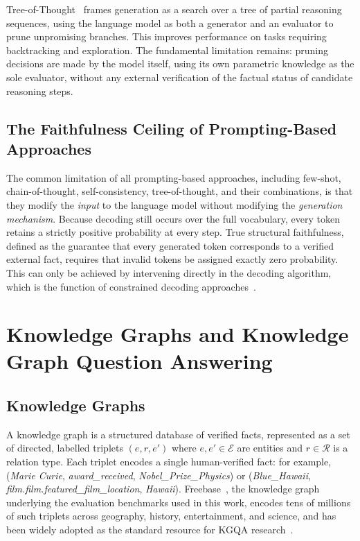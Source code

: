 Tree-of-Thought~\citep{yao2023tree} frames generation as a search over a tree of partial reasoning sequences, using the language model as both a generator and an evaluator to prune unpromising branches. This improves performance on tasks requiring backtracking and exploration. The fundamental limitation remains: pruning decisions are made by the model itself, using its own parametric knowledge as the sole evaluator, without any external verification of the factual status of candidate reasoning steps.

\subsection{The Faithfulness Ceiling of Prompting-Based Approaches}

The common limitation of all prompting-based approaches, including few-shot, chain-of-thought, self-consistency, tree-of-thought, and their combinations, is that they modify the \textit{input} to the language model without modifying the \textit{generation mechanism}. Because decoding still occurs over the full vocabulary, every token retains a strictly positive probability at every step. True structural faithfulness, defined as the guarantee that every generated token corresponds to a verified external fact, requires that invalid tokens be assigned exactly zero probability. This can only be achieved by intervening directly in the decoding algorithm, which is the function of constrained decoding approaches~\citep{geng2023gcd, willard2023outlines}.

\section{Knowledge Graphs and Knowledge Graph Question Answering}
\label{sec:kgqa}

\subsection{Knowledge Graphs}

A knowledge graph is a structured database of verified facts, represented as a set of directed, labelled triplets $(e, r, e')$ where $e, e' \in \mathcal{E}$ are entities and $r \in \mathcal{R}$ is a relation type. Each triplet encodes a single human-verified fact: for example, (\textit{Marie Curie}, \textit{award\_received}, \textit{Nobel\_Prize\_Physics}) or (\textit{Blue\_Hawaii}, \textit{film.film.featured\_film\_location}, \textit{Hawaii}). Freebase~\citep{bollacker2008freebase}, the knowledge graph underlying the evaluation benchmarks used in this work, encodes tens of millions of such triplets across geography, history, entertainment, and science, and has been widely adopted as the standard resource for KGQA research~\citep{yih2016websqp, talmor2018cwq}.

